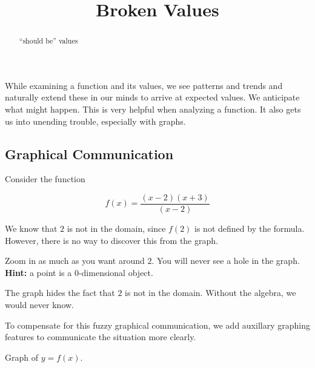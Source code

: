 \documentclass{ximera}
\title{Broken Values}
\begin{document}
\begin{abstract}
``should be'' values
\end{abstract}
\maketitle






While examining a function and its values, we see patterns and trends and naturally extend these in our minds to arrive at expected values. We anticipate what might happen.  This is very helpful when analyzing a function. It also gets us into unending trouble, especially with graphs.






\subsection{Graphical Communication}


Consider the function 

\[ f(x) = \frac{(x-2)(x+3)}{(x-2)} \]

We know that $2$ is not in the domain, since $f(2)$ is not defined  by the formula.  However, there is no way to discover this from the graph.


Zoom in as much as you want around $2$. You will never see a hole in the graph.   \\
\textbf{Hint:} a point is a $0$-dimensional object. \\

\begin{center}
\end{center}

The graph hides the fact that $2$ is not in the domain.  Without the algebra, we would never know.

To compensate for this fuzzy graphical communication, we add auxillary graphing features to communicate the situation more clearly.



Graph of $y = f(x)$.
\end{document}
